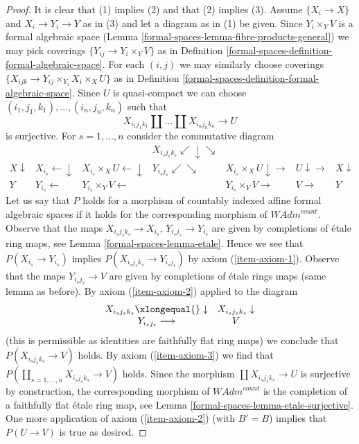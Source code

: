 \begin{proof}
It is clear that (1) implies (2) and that (2) implies (3).
Assume $\{X_i \to X\}$ and $X_i \to Y_i \to Y$ as in (3)
and let a diagram as in (1) be given.
Since $Y_i \times_Y V$ is a formal algebraic space
(Lemma \ref{formal-spaces-lemma-fibre-products-general}) we may pick
coverings $\{Y_{ij} \to Y_i \times_Y V\}$ as in
Definition \ref{formal-spaces-definition-formal-algebraic-space}.
For each $(i, j)$ we may similarly choose coverings
$\{X_{ijk} \to Y_{ij} \times_{Y_i} X_i \times_X U\}$
as in Definition \ref{formal-spaces-definition-formal-algebraic-space}.
Since $U$ is quasi-compact we can choose
$(i_1, j_1, k_1), \ldots, (i_n, j_n, k_n)$ such that
$$
X_{i_1 j_1 k_1} \amalg \ldots \amalg X_{i_n j_n k_n} \longrightarrow U
$$
is surjective. For $s = 1, \ldots, n$ consider the commutative diagram
$$
\begin{array}{ccccccc} &  &  & X_{i_s j_s k_s} \swarrow\downarrow\searrow &  &  &  \\ X \downarrow & X_{i_s} \longleftarrow\downarrow & X_{i_s} \times_X U \longleftarrow\downarrow & Y_{i_s j_s} \swarrow\searrow & X_{i_s} \times_X U \downarrow\longrightarrow & U \downarrow\longrightarrow & X \downarrow \\ Y & Y_{i_s} \longleftarrow & Y_{i_s} \times_Y V \longleftarrow &  & Y_{i_s} \times_Y V \longrightarrow & V \longrightarrow & Y\end{array}
$$
Let us say that $P$ holds for a morphism of countably indexed
affine formal algebraic spaces if it holds for the corresponding
morphism of $\textit{WAdm}^{count}$. Observe that the maps
$X_{i_s j_s k_s} \to X_{i_s}$, $Y_{i_s j_s} \to Y_{i_s}$
are given by completions of \'etale ring maps, see Lemma \ref{formal-spaces-lemma-etale}.
Hence we see that $P(X_{i_s} \to Y_{i_s})$ implies
$P(X_{i_s j_s k_s} \to Y_{i_s j_s})$ by axiom (\ref{item-axiom-1}).
Observe that the maps $Y_{i_s j_s} \to V$ are given by completions of
\'etale rings maps (same lemma as before).
By axiom (\ref{item-axiom-2}) applied to the diagram
$$
\begin{array}{cc}X_{i_s j_s k_s} \xlongequal{}\downarrow & X_{i_s j_s k_s} \downarrow \\ Y_{i_s j_s} \longrightarrow & V\end{array}
$$
(this is permissible as identities are faithfully flat ring maps)
we conclude that $P(X_{i_s j_s k_s} \to V)$ holds.
By axiom (\ref{item-axiom-3}) we find that
$P(\coprod_{s = 1, \ldots, n} X_{i_s j_s k_s} \to V)$ holds.
Since the morphism $\coprod X_{i_s j_s k_s} \to U$ is surjective
by construction, the corresponding morphism of $\textit{WAdm}^{count}$
is the completion of a faithfully flat \'etale ring map, see
Lemma \ref{formal-spaces-lemma-etale-surjective}.
One more application of axiom (\ref{item-axiom-2})
(with $B' = B$) implies that $P(U \to V)$ is true as desired.
\end{proof}

